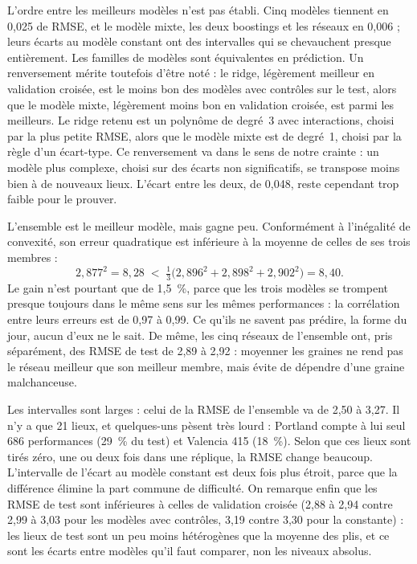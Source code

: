 \documentclass[11pt,a4paper]{article}
\begin{document}
L'ordre entre les meilleurs modèles n'est pas établi. Cinq modèles tiennent en 0,025 de RMSE, et le modèle mixte, les
deux boostings et les réseaux en 0,006 ; leurs écarts au modèle constant ont des intervalles qui se chevauchent
presque entièrement. Les familles de modèles sont équivalentes en prédiction. Un renversement mérite toutefois
d'être noté : le ridge, légèrement meilleur en validation croisée, est le moins bon des modèles avec contrôles sur le
test, alors que le modèle mixte, légèrement moins bon en validation croisée, est parmi les meilleurs. Le ridge retenu
est un polynôme de degré~3 avec interactions, choisi par la plus petite RMSE, alors que le modèle mixte est de degré~1,
choisi par la règle d'un écart-type. Ce renversement va dans le sens de notre crainte : un modèle plus complexe,
choisi sur des écarts non significatifs, se transpose moins bien à de nouveaux lieux. L'écart entre les deux, de
0,048, reste cependant trop faible pour le prouver.

L'ensemble est le meilleur modèle, mais gagne peu. Conformément à l'inégalité de convexité, son erreur quadratique
est inférieure à la moyenne de celles de ses trois membres :
\[
2{,}877^2 = 8{,}28 \;<\; \tfrac13\big(2{,}896^2 + 2{,}898^2 + 2{,}902^2\big) = 8{,}40 .
\]
Le gain n'est pourtant que de 1,5~\%, parce que les trois
modèles se trompent presque toujours dans le même sens sur les mêmes performances : la corrélation entre leurs erreurs
est de 0,97 à 0,99. Ce qu'ils ne savent pas prédire, la forme du jour, aucun d'eux ne le sait. De même, les cinq
réseaux de l'ensemble ont, pris séparément, des RMSE de test de 2,89 à 2,92 : moyenner les graines ne rend pas le
réseau meilleur que son meilleur membre, mais évite de dépendre d'une graine malchanceuse.

Les intervalles sont larges : celui de la RMSE de l'ensemble va de 2,50 à 3,27. Il n'y a que 21 lieux, et quelques-uns
pèsent très lourd : Portland compte à lui seul 686 performances (29~\% du test) et Valencia 415 (18~\%). Selon que ces
lieux sont tirés zéro, une ou deux fois dans une réplique, la RMSE change beaucoup. L'intervalle de l'écart au modèle
constant est deux fois plus étroit, parce que la différence élimine la part commune de difficulté. On remarque enfin
que les RMSE de test sont inférieures à celles de validation croisée (2,88 à 2,94 contre 2,99 à 3,03 pour les modèles
avec contrôles, 3,19 contre 3,30 pour la constante) : les lieux de test sont un peu moins hétérogènes que la moyenne
des plis, et ce sont les écarts entre modèles qu'il faut comparer, non les niveaux absolus.
\end{document}
